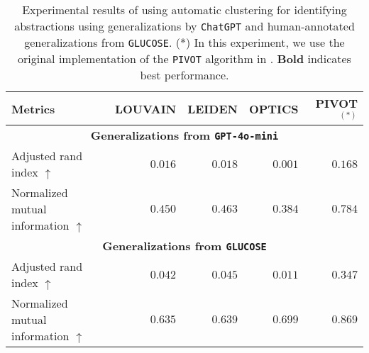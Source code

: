 \begin{table*}[hbt!]
    \centering
\begin{tabular}{l|r r r r}
\toprule
Metrics       & \textbf{LOUVAIN} & \textbf{LEIDEN} & \textbf{OPTICS} & \textbf{PIVOT}$^{(*)}$   \\
\hline
\multicolumn{5}{c}{\cellcolor[HTML]{C0C0C0}\textbf{Generalizations from \texttt{GPT-4o-mini}}} \\ \toprule
Adjusted rand index $\uparrow$               & $0.016$    & $0.018$   & $0.001$   & $\mathbf{0.168}$  \\
Normalized mutual information $\uparrow$               & $0.450$    & $0.463$   & $0.384$   & $\mathbf{0.784}$  \\

\hline
\multicolumn{5}{c}{\cellcolor[HTML]{C0C0C0}\textbf{Generalizations from \texttt{GLUCOSE}}} \\ \toprule
Adjusted rand index $\uparrow$               & $0.042$    & $0.045$   & $0.011$   & $\mathbf{0.347}$  \\
Normalized mutual information $\uparrow$               & $0.635$    & $0.639$   & $0.699$   & $\mathbf{0.869}$  \\

\bottomrule
\end{tabular}
    \caption{Experimental results of using automatic clustering for identifying abstractions using generalizations by \texttt{ChatGPT} and human-annotated generalizations from \texttt{GLUCOSE}.  (*) In this experiment, we use the original implementation of the \texttt{PIVOT} algorithm in \citet{fukunaga2019lp}. \textbf{Bold} indicates best performance.}
    \label{tab:clustering_abs}
\end{table*}


